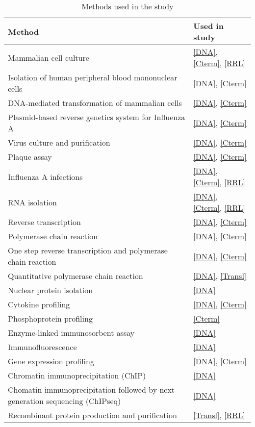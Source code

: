 	\begin{longtabu} to \linewidth {X[8,l] X[2,c]}		
		\caption{Methods used in the study} \label{tab:methods}\\
		
		\hline \textbf{Method} & \textbf{Used in study} \\ 
		\endhead
		
		\hline Mammalian cell culture & \ref*{DNA}, \ref*{Cterm}, \ref*{RRL} \\
		\hline Isolation of human peripheral blood mononuclear cells & \ref*{DNA}, \ref*{Cterm} \\
		\hline DNA-mediated transformation of mammalian cells & \ref*{DNA}, \ref*{Cterm}\\
		\hline Plasmid-based reverse genetics system for Influenza A & \ref*{DNA}, \ref*{Cterm} \\
		\hline Virus culture and purification & \ref*{DNA}, \ref*{Cterm} \\ 
		\hline Plaque assay & \ref*{DNA}, \ref*{Cterm} \\
		\hline Influenza A infections & \ref*{DNA}, \ref*{Cterm}, \ref*{RRL} \\ 
		\hline RNA isolation & \ref*{DNA}, \ref*{Cterm}, \ref*{RRL} \\
		\hline Reverse transcription & \ref*{DNA}, \ref*{Cterm} \\
		\hline Polymerase chain reaction & \ref*{DNA}, \ref*{Cterm} \\
		\hline One step reverse transcription and polymerase chain reaction & \ref*{DNA}, \ref*{Cterm} \\
		\hline Quantitative polymerase chain reaction & \ref*{DNA}, \ref*{Transl} \\
		\hline Nuclear protein isolation & \ref*{DNA} \\
		\hline Cytokine profiling & \ref*{DNA}, \ref*{Cterm} \\
		\hline Phosphoprotein profiling & \ref*{Cterm} \\
		\hline Enzyme-linked immunosorbent assay & \ref*{DNA} \\
		\hline Immunofluorescence & \ref*{DNA} \\ 
		\hline Gene expression profiling & \ref*{DNA}, \ref*{Cterm} \\
		\hline Chromatin immunoprecipitation (ChIP)& \ref*{DNA}\\
		\hline Chomatin immunoprecipitation followed by next generation sequencing (ChIPseq) & \ref*{DNA}\\
		\hline Recombinant protein production and purification & \ref*{Transl}, \ref*{RRL} \\

\end{longtabu}
